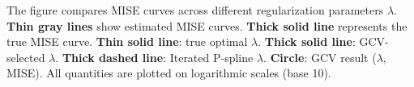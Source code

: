 The figure compares MISE curves across different regularization parameters $\lambda$. \textbf{Thin gray lines} show estimated MISE curves. \textbf{Thick solid line} represents the true MISE curve. \textbf{Thin solid line}: true optimal $\lambda$. \textbf{Thick solid line}: GCV-selected $\lambda$. \textbf{Thick dashed line}: Iterated P-spline $\lambda$. \textbf{Circle}: GCV result ($\lambda$, MISE). All quantities are plotted on logarithmic scales (base 10).
